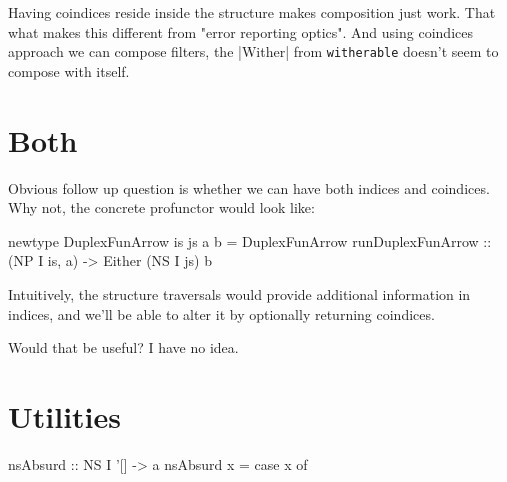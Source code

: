 Having coindices reside inside the structure makes composition just work.
That what makes this different from "error reporting optics".
And using coindices approach we can compose filters,
the |Wither| from \texttt{witherable} doesn't seem to compose
with itself.

\section{Both}

Obvious follow up question is whether we can have both indices and coindices.
Why not, the concrete profunctor would look like:

\begin{code}
newtype DuplexFunArrow is js a b = DuplexFunArrow
    { runDuplexFunArrow :: (NP I is, a) -> Either (NS I js) b }
\end{code}

Intuitively, the structure traversals would provide additional
information in indices, and we'll be able to alter it by optionally
returning coindices.

Would that be useful? I have no idea.

\appendix

\section{Utilities}

\begin{code}
nsAbsurd :: NS I '[] -> a
nsAbsurd x = case x of {}
\end{code}
